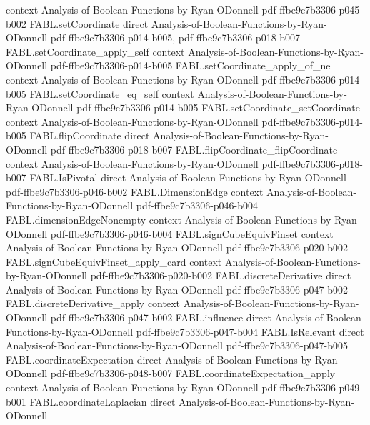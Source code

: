 \begin{theorem}
  {context}
  {Analysis-of-Boolean-Functions-by-Ryan-ODonnell}
  {pdf-ffbe9c7b3306-p045-b002}
\proofstep
  {FABL.setCoordinate}
  {direct}
  {Analysis-of-Boolean-Functions-by-Ryan-ODonnell}
  {pdf-ffbe9c7b3306-p014-b005,
    pdf-ffbe9c7b3306-p018-b007}
\proofstep
  {FABL.setCoordinate_apply_self}
  {context}
  {Analysis-of-Boolean-Functions-by-Ryan-ODonnell}
  {pdf-ffbe9c7b3306-p014-b005}
\proofstep
  {FABL.setCoordinate_apply_of_ne}
  {context}
  {Analysis-of-Boolean-Functions-by-Ryan-ODonnell}
  {pdf-ffbe9c7b3306-p014-b005}
\proofstep
  {FABL.setCoordinate_eq_self}
  {context}
  {Analysis-of-Boolean-Functions-by-Ryan-ODonnell}
  {pdf-ffbe9c7b3306-p014-b005}
\proofstep
  {FABL.setCoordinate_setCoordinate}
  {context}
  {Analysis-of-Boolean-Functions-by-Ryan-ODonnell}
  {pdf-ffbe9c7b3306-p014-b005}
\proofstep
  {FABL.flipCoordinate}
  {direct}
  {Analysis-of-Boolean-Functions-by-Ryan-ODonnell}
  {pdf-ffbe9c7b3306-p018-b007}
\proofstep
  {FABL.flipCoordinate_flipCoordinate}
  {context}
  {Analysis-of-Boolean-Functions-by-Ryan-ODonnell}
  {pdf-ffbe9c7b3306-p018-b007}
\proofstep
  {FABL.IsPivotal}
  {direct}
  {Analysis-of-Boolean-Functions-by-Ryan-ODonnell}
  {pdf-ffbe9c7b3306-p046-b002}
\proofstep
  {FABL.DimensionEdge}
  {context}
  {Analysis-of-Boolean-Functions-by-Ryan-ODonnell}
  {pdf-ffbe9c7b3306-p046-b004}
\proofstep
  {FABL.dimensionEdgeNonempty}
  {context}
  {Analysis-of-Boolean-Functions-by-Ryan-ODonnell}
  {pdf-ffbe9c7b3306-p046-b004}
\proofstep
  {FABL.signCubeEquivFinset}
  {context}
  {Analysis-of-Boolean-Functions-by-Ryan-ODonnell}
  {pdf-ffbe9c7b3306-p020-b002}
\proofstep
  {FABL.signCubeEquivFinset_apply_card}
  {context}
  {Analysis-of-Boolean-Functions-by-Ryan-ODonnell}
  {pdf-ffbe9c7b3306-p020-b002}
\proofstep
  {FABL.discreteDerivative}
  {direct}
  {Analysis-of-Boolean-Functions-by-Ryan-ODonnell}
  {pdf-ffbe9c7b3306-p047-b002}
\proofstep
  {FABL.discreteDerivative_apply}
  {context}
  {Analysis-of-Boolean-Functions-by-Ryan-ODonnell}
  {pdf-ffbe9c7b3306-p047-b002}
\proofstep
  {FABL.influence}
  {direct}
  {Analysis-of-Boolean-Functions-by-Ryan-ODonnell}
  {pdf-ffbe9c7b3306-p047-b004}
\proofstep
  {FABL.IsRelevant}
  {direct}
  {Analysis-of-Boolean-Functions-by-Ryan-ODonnell}
  {pdf-ffbe9c7b3306-p047-b005}
\proofstep
  {FABL.coordinateExpectation}
  {direct}
  {Analysis-of-Boolean-Functions-by-Ryan-ODonnell}
  {pdf-ffbe9c7b3306-p048-b007}
\proofstep
  {FABL.coordinateExpectation_apply}
  {context}
  {Analysis-of-Boolean-Functions-by-Ryan-ODonnell}
  {pdf-ffbe9c7b3306-p049-b001}
\proofstep
  {FABL.coordinateLaplacian}
  {direct}
  {Analysis-of-Boolean-Functions-by-Ryan-ODonnell}

\end{theorem}
